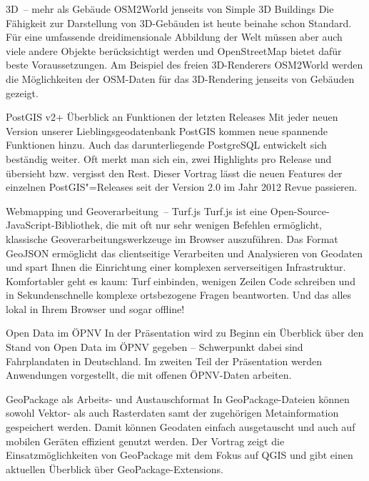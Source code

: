 %
{3D~-- mehr als Gebäude}%
{OSM2World jenseits von Simple 3D Buildings}%
{%
Die Fähigkeit zur Darstellung von 3D-Gebäuden ist heute beinahe schon Standard. Für eine umfassende
dreidimensionale Abbildung der Welt müssen aber auch viele andere Objekte berücksichtigt werden und
OpenStreetMap bietet dafür beste Voraussetzungen. Am Beispiel des freien 3D-Renderers OSM2World
werden die Möglichkeiten der OSM-Daten für das 3D-Rendering jenseits von Gebäuden gezeigt.%
}


%
{PostGIS v2+}%
{Überblick an Funktionen der letzten Releases}%
{%
Mit jeder neuen Version unserer Lieblingsgeodatenbank PostGIS kommen neue spannende Funktionen
hinzu. Auch das darunterliegende PostgreSQL entwickelt sich beständig weiter. Oft merkt man sich
ein, zwei Highlights pro Release und übersieht bzw. vergisst den Rest. Dieser Vortrag lässt die
neuen Features der einzelnen PostGIS"=Releases seit der Version 2.0 im Jahr 2012 Revue passieren.%
}

%
{Webmapping und Geoverarbeitung~-- Turf.js}%
{}%
{%
Turf.js ist eine Open-Source-JavaScript-Bibliothek, die mit oft nur sehr wenigen Befehlen
ermöglicht, klassische Geoverarbeitungswerkzeuge im Browser auszuführen. Das Format GeoJSON
ermöglicht das clientseitige Verarbeiten und Analysieren von Geodaten und spart Ihnen die
Einrichtung einer komplexen serverseitigen Infrastruktur. Komfortabler geht es kaum: Turf einbinden,
wenigen Zeilen Code schreiben und in Sekundenschnelle komplexe ortsbezogene Fragen beantworten. Und
das alles lokal in Ihrem Browser und sogar offline!%
}

%
{Open Data im ÖPNV}%
{}%
{%
In der Präsentation wird zu Beginn ein Überblick über den Stand von Open Data im ÖPNV gegeben --
Schwerpunkt dabei sind Fahrplandaten in Deutschland. Im zweiten Teil der Präsentation werden
Anwendungen vorgestellt, die mit offenen ÖPNV-Daten arbeiten.%
}

%
{GeoPackage als Arbeits- und \mbox{Austauschformat}}%
{}%
{%
In GeoPackage-Dateien können sowohl Vektor- als auch Rasterdaten samt der zugehörigen Metainformation
gespeichert werden. Damit können Geodaten einfach ausgetauscht und auch auf mobilen Geräten
effizient genutzt werden.  Der Vortrag zeigt die Einsatzmöglichkeiten von GeoPackage mit dem Fokus
auf QGIS und gibt einen aktuellen Überblick über GeoPackage-Extensions.%
}

